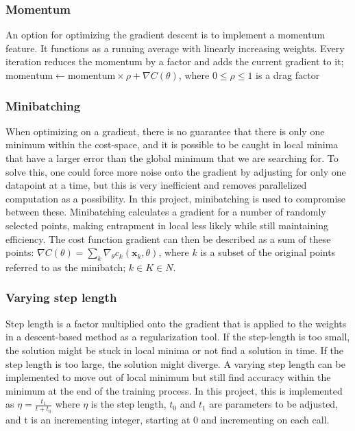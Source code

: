 \documentclass[a4paper, UKenglish]{article}
\newcommand{\0}{\mathbf{0}}
\newcommand{\1}{\mathbf{1}}
\begin{document}
\subsubsection{Momentum}
An option for optimizing the gradient descent is to implement a momentum feature. It functions as a running average with linearly increasing weights. Every iteration reduces the momentum by a factor and adds the current gradient to it; $\text{momentum} \leftarrow \text{momentum}\times \rho + \nabla C(\theta) $, where $0 \leq \rho \leq 1$ is a drag factor 

\subsubsection{Minibatching}
When optimizing on a gradient, there is no guarantee that there is only one minimum within the cost-space, and it is possible to be caught in local minima that have a larger error than the global minimum that we are searching for. To solve this, one could force more noise onto the gradient by adjusting for only one datapoint at a time, but this is very inefficient and removes parallelized computation as a possibility. In this project, minibatching is used to compromise between these. Minibatching calculates a gradient for a number of randomly selected points, making entrapment in local less likely while still maintaining efficiency. The cost function gradient can then be described as a sum of these points: $\nabla C(\theta) = \sum\limits_{k} \nabla_\theta c_k(\textbf{x}_k,\theta)$, where $k$ is a subset of the original points referred to as the minibatch; $k\in K \in N$.

\subsubsection{Varying step length} \label{sec:varying step length}
Step length is a factor multiplied onto the gradient that is applied to the weights in a descent-based method as a regularization tool. If the step-length is too small, the solution might be stuck in local minima or not find a solution in time. If the step length is too large, the solution might diverge. A varying step length can be implemented to move out of local minimum but still find accuracy within the minimum at the end of the training process. In this project, this is implemented as $\eta = \frac{t_1}{t + t_0}$ where $\eta$ is the step length, $t_0$ and $t_1$ are parameters to be adjusted, and t is an incrementing integer, starting at 0 and incrementing on each call.
\end{document}
